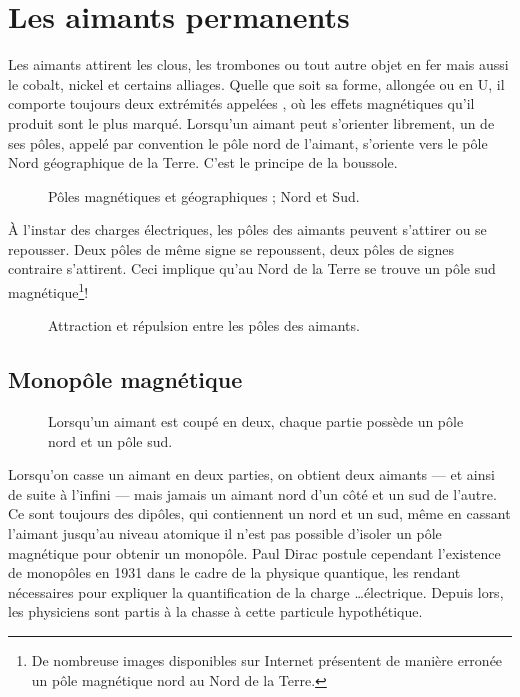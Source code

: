 \newpage

\section{Les aimants permanents}
Les aimants attirent les clous, les trombones ou tout autre objet en fer mais aussi le cobalt, nickel et certains alliages. Quelle que soit sa forme, allongée ou en U, il comporte toujours deux extrémités appelées , où les effets magnétiques qu'il produit sont le plus marqué. Lorsqu'un aimant peut s'orienter librement, un de ses pôles, appelé par convention le pôle nord de l'aimant, s'oriente vers le pôle Nord géographique de la Terre. C'est le principe de la boussole.
\begin{figure}[h!]
    \centering
    {}
    \caption{Pôles magnétiques et géographiques ; Nord et Sud.}
    \label{champ_magnetique_terre}
\end{figure}

\newpage
À l'instar des charges électriques, les pôles des aimants peuvent s'attirer ou se repousser. Deux pôles de même signe se repoussent, deux pôles de signes contraire s'attirent. Ceci implique qu'au Nord de la Terre se trouve un pôle sud magnétique\footnote{De nombreuse images disponibles sur Internet présentent de manière erronée un pôle magnétique nord au Nord de la Terre.}!


\begin{figure}[h!]
    \centering
    \resizebox{.7\linewidth}{!}
    {}
    \caption{Attraction et répulsion entre les pôles des aimants.}
    \label{ar_aimants_droits}
\end{figure}

\newpage

\subsection{Monopôle magnétique}
\begin{wrapfigure}[10]{r}{0.3\textwidth}
    \vspace{-\baselineskip}
    
    \caption{Lorsqu'un aimant est coupé en deux, chaque partie possède un pôle nord et un pôle sud.}
    \label{monopole}
\end{wrapfigure}

Lorsqu'on casse un aimant en deux parties, on obtient deux aimants --- et ainsi de suite à l'infini --- mais jamais un aimant nord d'un côté et un sud de l'autre. Ce sont toujours des dipôles, qui contiennent un nord et un sud, même en cassant l'aimant jusqu'au niveau atomique il n'est pas possible d'isoler un pôle magnétique pour obtenir un monopôle.
Paul Dirac postule cependant l'existence de monopôles en 1931 dans le cadre de la physique quantique, les rendant nécessaires pour expliquer la quantification de la charge \ldots électrique. Depuis lors, les physiciens sont partis à la chasse à cette particule hypothétique.

